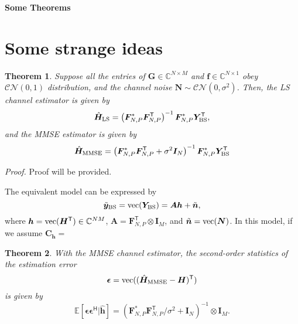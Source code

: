 \documentclass[a4paper,12pt]{article}
\newtheorem{theorem}{\bf Theorem}
\def \T {^{\mathsf{T}}}
\def \H {^{\mathsf{H}}}
\begin{document}
    
\begin{center}
    {\Large\bf Some Theorems}
\end{center}


\section{Some strange ideas}
\begin{theorem} 
    Suppose all the entries of ${\bm G}\in\mathbb{C}^{N\times M}$ and ${\bm f}\in\mathbb{C}^{N\times 1}$ obey ${\mathcal{CN}(0,1)}$ distribution, and the channel noise ${\bm N}\sim \mathcal{CN}(0,\sigma^2)$. 
    Then, the LS channel estimator is given by 
    \begin{equation}
        \hat{\bm{H}}_{\rm LS} = \left( {\bm F}_{N,P}^{*} {\bm F_{N,P}\T} \right)^{-1}{\bm F}_{N,P}^{*}{\bm Y}_{\rm BS}\T,
    \end{equation}
    and the MMSE estimator is given by 
    \begin{equation}
        \hat{\bm{H}}_{\rm MMSE} = \left( {\bm F}_{N,P}^{*} {\bm F_{N,P}\T + \sigma^2 {\bm I}_N} \right)^{-1}{\bm F}_{N,P}^{*}{\bm Y}_{\rm BS}\T
    \end{equation}
\end{theorem}

{\it Proof.}
Proof will be provided. 

The equivalent model can be expressed by 
\begin{equation}
    \tilde{\bm y}_{\rm BS} = {\rm vec}({\bm Y}_{\rm BS}) = {\bm A}{\bm h} + \tilde{\bm n},
\end{equation}
where ${\bm h} = {\rm vec}({\bm H}\T)\in\mathbb{C}^{NM}$, ${\bm A} = {\bm F}_{N,P}\T\otimes {\bm I}_M$, and $\tilde{\bm n} = {\rm vec}({\bm N})$. In this model, if we assume ${\bm C}_{\bm h} = $ 

\begin{theorem}
    With the MMSE channel estimator, the second-order statistics of the estimation error 
    \begin{equation}
        {\bm \epsilon} = {\rm vec}((\hat{{\bm H}}_{\rm MMSE} - {\bm H})\T)  
    \end{equation}
    is given by 
    \begin{equation}
        \mathbb{E}[{\bm \epsilon}{\bm \epsilon}\H | \hat{\bm h}] = \left( {\bm F}_{N,P}^{*} {\bm F_{N,P}\T / \sigma^2 + {\bm I}_N} \right)^{-1} \otimes {\bm I}_M.
    \end{equation}
\end{theorem}
\end{document}
